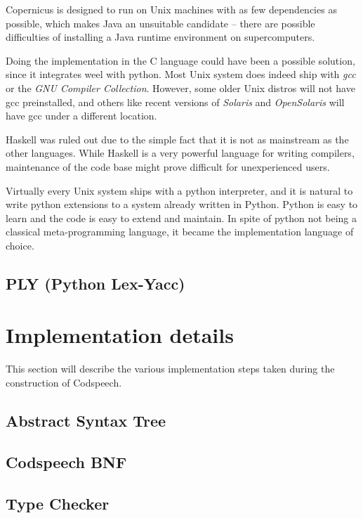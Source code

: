 Copernicus is designed to run on Unix machines with as few
dependencies as possible, which makes Java an unsuitable candidate --
there are possible difficulties of installing a Java runtime
environment on supercomputers.

Doing the implementation in the C language could have been a possible
solution, since it integrates weel with python. Most Unix system does
indeed ship with \emph{gcc} or the \emph{GNU Compiler
  Collection}. However, some older Unix distros will not have gcc
preinstalled, and others like recent versions of \emph{Solaris} and
\emph{OpenSolaris} will have gcc under a different location.

Haskell was ruled out due to the simple fact that it is not as
mainstream as the other languages. While Haskell is a very powerful
language for writing compilers, maintenance of the code base might
prove difficult for unexperienced users.

Virtually every Unix system ships with a python interpreter, and it is
natural to write python extensions to a system already written in
Python. Python is easy to learn and the code is easy to extend and
maintain. In spite of python not being a classical meta-programming
language, it became the implementation language of choice.


\subsection{PLY (Python Lex-Yacc)}\label{sec:ply}



\section{Implementation details}
This section will describe the various implementation steps taken
during the construction of Codspeech.

\subsection{Abstract Syntax Tree}\label{sec:ast}



\subsection{Codspeech BNF}\label{sec:bnf}



\subsection{Type Checker}\label{sec:typechecker}


